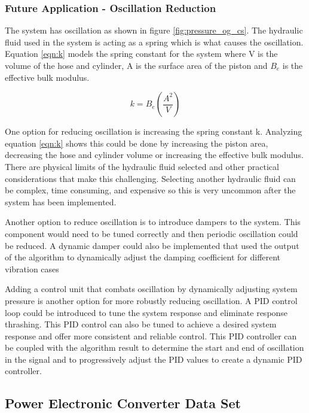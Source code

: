 \subsubsection{Future Application - Oscillation Reduction}

The system has oscillation as shown in figure \ref{fig:pressure_og_cs}. The hydraulic fluid used in the system is acting as a spring which is what causes the oscillation. Equation \ref{eqn:k} models the spring constant for the system where V is the volume of the hose and cylinder, A is the surface area of the piston and $B_e$ is the effective bulk modulus. 

\begin{equation}
    k = B_e \left ( \frac{A^2}{V} \right)
    \label{eqn:k}
\end{equation}

One option for reducing oscillation is increasing the spring constant k. Analyzing equation \ref{eqn:k} shows this could be done by increasing the piston area, decreasing the hose and cylinder volume or increasing the effective bulk modulus. There are physical limits of the hydraulic fluid selected and other practical considerations that make this challenging. Selecting another hydraulic fluid can be complex, time consuming, and expensive so this is very uncommon after the system has been implemented. 

Another option to reduce oscillation is to introduce dampers to the system. This component would need to be tuned correctly and then periodic oscillation could be reduced. A dynamic damper could also be implemented that used the output of the algorithm to dynamically adjust the damping coefficient for different vibration cases 

Adding a control unit that combats oscillation by dynamically adjusting system pressure is another option for more robustly reducing oscillation. A PID control loop could be introduced to tune the system response and eliminate response thrashing. This PID control can also be tuned to achieve a desired system response and offer more consistent and reliable control. This PID controller can be coupled with the algorithm result to determine the start and end of oscillation in the signal and to progressively adjust the PID values to create a dynamic PID controller.


\subsection{Power Electronic Converter Data Set}

